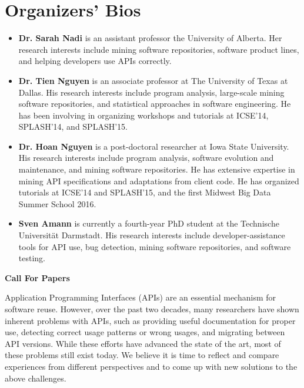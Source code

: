 \documentclass[10pt, conference]{IEEEtran}
\begin{document}
\section{Organizers' Bios}
\begin{itemize}
\setlength\itemsep{5pt}
\item \textbf{Dr. Sarah Nadi} is an assistant professor the University of Alberta. Her research interests include mining software repositories, software product lines, and helping developers use APIs correctly.

\item \textbf{Dr. Tien Nguyen} is an associate professor at The University of Texas at Dallas. His research interests include program analysis, large-scale mining software repositories, and statistical approaches in software engineering. He has been involving in organizing workshops and tutorials at ICSE’14, SPLASH’14, and SPLASH’15.

\item \textbf{Dr. Hoan Nguyen} is a post-doctoral researcher at Iowa State University. His research interests include program analysis, software evolution and maintenance, and mining software repositories. He has extensive expertise in mining API specifications and adaptations from client code. He has organized tutorials at ICSE'14 and SPLASH'15, and the first Midwest Big Data Summer School 2016.

\item \textbf{Sven Amann} is currently a fourth-year PhD student at the Technische Universit\"{a}t Darmstadt. His research interests include developer-assistance tools for API use, bug detection, mining software repositories, and software testing.
\end{itemize}




\newpage
\onecolumn

\begin{center}
\Large{\textbf{Call For Papers}}
\end{center}

Application Programming Interfaces (APIs) are an essential mechanism for software reuse. However, over the past two decades, many researchers have shown inherent problems with APIs, such as providing useful documentation for proper use, detecting correct usage patterns or wrong usages, and migrating between API versions. While these efforts have advanced the state of the art, most of these problems still exist today. We believe it is time to reflect and compare experiences from different perspectives and to come up with new solutions to the above challenges. 
\end{document}
